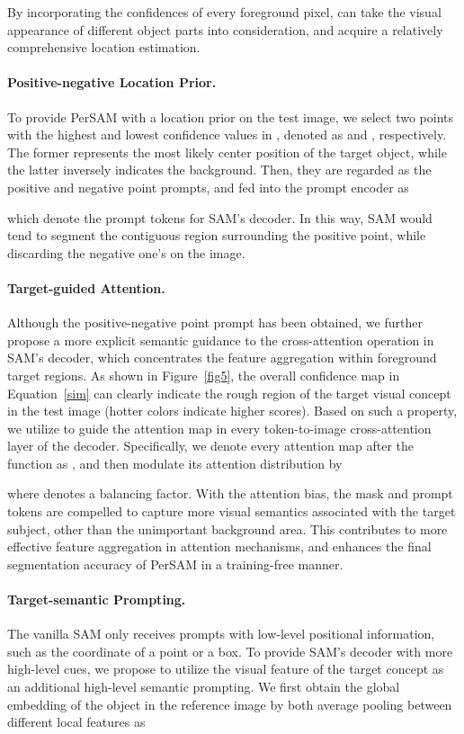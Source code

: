 \documentclass{article} \usepackage{iclr2024_conference,times}
\begin{document}
By incorporating the confidences of every foreground pixel,  can take the visual appearance of different object parts into consideration, and acquire a relatively comprehensive location estimation.


\paragraph{Positive-negative Location Prior.}
To provide PerSAM with a location prior on the test image, we select two points with the highest and lowest confidence values in , denoted as  and , respectively. The former represents the most likely center position of the target object, while the latter inversely indicates the background. Then, they are regarded as the positive and negative point prompts, and fed into the prompt encoder as

which denote the prompt tokens for SAM's decoder.
In this way, SAM would tend to segment the contiguous region surrounding the positive point, while discarding the negative one's on the image.


\paragraph{Target-guided Attention.}
Although the positive-negative point prompt has been obtained, we further propose a more explicit semantic guidance to the cross-attention operation in SAM's decoder, which concentrates the feature aggregation within foreground target regions.
As shown in Figure~\ref{fig5}, the overall confidence map  in Equation~\ref{sim} can clearly indicate the rough region of the target visual concept in the test image (hotter colors indicate higher scores). Based on such a property, we utilize  to guide the attention map in every token-to-image cross-attention layer of the decoder. Specifically, we denote every attention map after the  function as , and then modulate its attention distribution by

where  denotes a balancing factor. With the attention bias, the mask and prompt tokens are compelled to capture more visual semantics associated with the target subject, other than the unimportant background area.
This contributes to more effective feature aggregation in attention mechanisms, and enhances the final segmentation accuracy of PerSAM in a training-free manner.


\paragraph{Target-semantic Prompting.}
The vanilla SAM only receives prompts with low-level positional information, such as the coordinate of a point or a box. To provide SAM's decoder with more high-level cues, we propose to utilize the visual feature of the target concept as an additional high-level semantic prompting. We first obtain the global embedding  of the object in the reference image by both average pooling between different local features as
\end{document}

